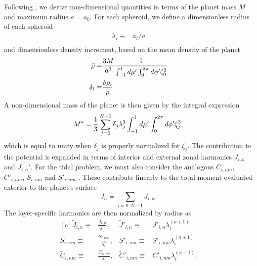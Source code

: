 Following \citet{hubbard2013}, we derive non-dimensional quantities in terms of the
planet mass $M$ and maximum radius $a=a_0$. For each spheroid, we define a
dimensionless radius of each spheroid
%
\begin{equation} \begin{aligned} \lambda_i \equiv& a_i/a \\
    \end{aligned} \label{eq:lambda} \end{equation}
%
and dimensionless density increment, based on the mean density of the planet
%
\begin{equation} \begin{aligned} \bar{\rho} =& \frac{3M}{a^3}\frac{1}{\int_{-1}^1 d\mu' \int_{0}^{2\pi} d\phi'
        \zeta_0^3} \\ \delta_i \equiv& \frac{\delta\rho_i}{\bar{\rho}}.
        \label{eq:delta} \end{aligned} \end{equation}
%
A non-dimensional mass of the planet is then given by the integral expression
%
\begin{equation} M^* = \frac{1}{3} \sum_{j=0}^{N-1} \delta_j \lambda_j^3 \int_{-1}^1 d\mu' \int_{0}^{2\pi} d\phi'
    \zeta_j^3,  \label{eq:mass} \end{equation}
%
which is equal to unity when $\delta_j$ is properly normalized for $\zeta_j$.  The
contribution to the potential is expanded in terms of interior and external zonal
harmonics $J_{i,n}$ and $J_{i,n}'$. For the tidal problem, we must also consider the
analogous $C_{i,nm}$, $C'_{i,nm}$, $S_{i,nm}$ and $S'_{i,nm}$ \citep{zharkov1978}.
These contribute linearly to the total moment evaluated exterior to the planet's
surface
%
\begin{equation} J_n = \sum_{i=0,N-1} J_{i,n}.  \label{eq:total_J2} \end{equation}
%
\newcommand{\til}{\widetilde}
%
The layer-specific harmonics are then normalized by radius as 
%
\begin{equation} \begin{aligned}[c] \til{J}_{i,n} \equiv&
        \frac{J_{i,n}}{\lambda_i^n}, & \til{J}'_{i,n} \equiv&
        J'_{i,n}\lambda_i^{(n+1)} \\ \til{S}_{i,nm} \equiv&
        \frac{S_{i,nm}}{\lambda_i^n}, & \til{S}'_{i,nm} \equiv&
        S'_{i,nm}\lambda_i^{(n+1)} \\ \til{C}_{i,nm} \equiv&
        \frac{C_{i,nm}}{\lambda_i^n}, & \til{C}'_{i,nm} \equiv&
        C'_{i,nm}\lambda_i^{(n+1)}.  \end{aligned} \label{eq:normalization}
\end{equation}
